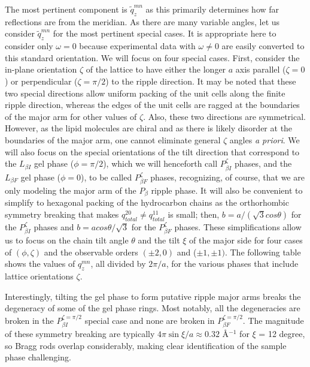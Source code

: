 \documentclass[
 preprint,
 showkeys, 
 amsmath,
 amssymb,
 aps,
]{revtex4-1}
\begin{document}
The most pertinent component is $\tilde{q}_z^{mn}$ as this primarily determines how far reflections are from the meridian.  As there are many variable angles, let us consider $\tilde{q}_z^{mn}$ for the most pertinent special cases.  It is appropriate here to consider only $\omega=0$ because experimental data with $\omega{\neq}0$ are easily converted to this standard orientation.  We will focus on four special cases.  First, consider the in-plane orientation ${\zeta}$ of the lattice to have either the longer $a$ axis parallel (${\zeta}=0$) or perpendicular (${\zeta}={\pi}/2$) to the ripple direction.  It may be noted that these two special directions allow uniform packing of the unit cells along the finite ripple direction, whereas the edges of the unit cells are ragged at the boundaries of the major arm for other values of ${\zeta}$.  Also, these two directions are symmetrical.  However, as the lipid molecules are chiral and as there is likely disorder at the boundaries of the major arm, one cannot eliminate general ${\zeta}$ angles {\it a priori}.  We will also focus on the special orientations of the tilt direction that correspond to the $L_{{\beta}I}$ gel phase ($\phi=\pi/2$), which we will henceforth call $P_{{\beta}I}^{\zeta}$ phases, and the $L_{{\beta}F}$ gel phase ($\phi=0$), to be called $P_{{\beta}F}^{\zeta}$ phases, recognizing, of course, that we are only modeling the major arm of the $P_{\beta}$ ripple phase.   It will also be convenient to simplify to hexagonal packing of the hydrocarbon chains as the orthorhombic symmetry breaking that makes $q_{total}^{20}{\neq}q_{total}^{11}$ is small; then, $b=a/(\sqrt{3}cos{\theta})$ for the $P_{{\beta}I}^{\zeta}$ phases and $b=acos{\theta}/\sqrt{3}$ for the $P_{{\beta}F}^{\zeta}$ phases.  These simplifications allow us to focus on the chain tilt angle $\theta$ and the tilt $\xi$ of the major side for four cases of $(\phi,\zeta)$ and the observable orders $({\pm}2,0)$ and (${\pm}1,{\pm}1)$.  The following table shows the values of $q_z^{mn}$, all divided by $2\pi/a$, for the various phases that include lattice orientations $\zeta$.  

Interestingly, tilting the gel phase to form putative ripple major arms breaks 
the degeneracy of some of the gel phase rings.  Most notably, all the 
degeneracies are broken in the $P_{\beta I}^{\zeta=\pi/2}$ special case and 
none are broken in $P_{\beta F}^{\zeta=\pi/2}$. The magnitude of these 
symmetry breaking are typically $4\pi\sin\xi/a \approx 0.32$ \AA$^{-1}$ 
for $\xi$ = 12 degree, so Bragg rods overlap considerably, making clear 
identification of the sample phase challenging.
\vspace{0.5cm}
\end{document}
